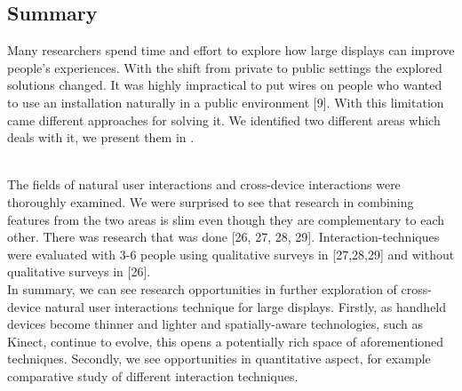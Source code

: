 \subsection{Summary}
Many researchers spend time and effort to explore how large displays can improve people's experiences. 
With the shift from private to public settings the explored solutions changed. 
It was highly impractical to put wires on people who wanted to use an installation naturally in a public environment [9].
With this limitation came different approaches for solving it. 
We identified two different areas which deals with it, we present them in .

\begin{figure*}
\centering
{}
\caption{}
\label{fig:litreview}
\end{figure*}
 \\
 
The fields of natural user interactions and cross-device interactions were thoroughly examined. 
We were surprised to see that research in combining features from the two areas is slim even though they are complementary to each other. 
There was research that was done [26, 27, 28, 29]. 
Interaction-techniques were evaluated with 3-6 people using qualitative surveys in [27,28,29] and without qualitative surveys in [26].\\

In summary, we can see research opportunities in further exploration of cross-device natural user interactions technique for large displays. 
Firstly, as handheld devices become thinner and lighter and spatially-aware technologies, such as Kinect, continue to evolve, this opens a potentially rich space of aforementioned techniques. 
Secondly, we see opportunities in quantitative aspect, for example comparative study of different interaction techniques. 
